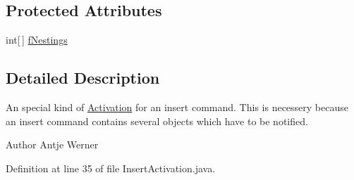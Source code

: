 \subsection*{Protected Attributes}
\begin{DoxyCompactItemize}
\item 
int\mbox{[}$\,$\mbox{]} \hyperlink{classorg_1_1tzi_1_1use_1_1gui_1_1views_1_1diagrams_1_1behavior_1_1sequencediagram_1_1_insert_activation_a219cbc636d48306819eed8f615eead5c}{f\-Nestings}
\end{DoxyCompactItemize}


\subsection{Detailed Description}
An special kind of \hyperlink{classorg_1_1tzi_1_1use_1_1gui_1_1views_1_1diagrams_1_1behavior_1_1sequencediagram_1_1_activation}{Activation} for an insert command. This is necessery because an insert command contains several objects which have to be notified.

\begin{DoxyAuthor}{Author}
Antje Werner 
\end{DoxyAuthor}


Definition at line 35 of file Insert\-Activation.\-java.



